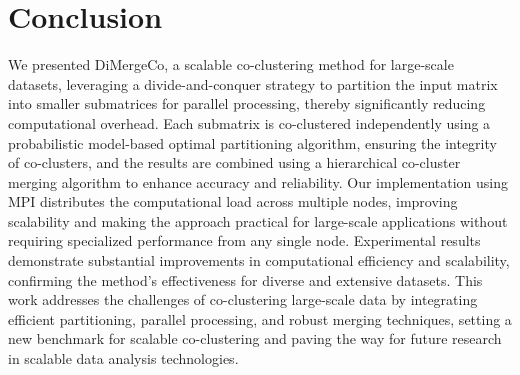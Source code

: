 \documentclass[journal]{IEEEtran}
\begin{document}
\section{Conclusion}
\label{sec:conclusion}
We presented DiMergeCo, a scalable co-clustering method for large-scale datasets, leveraging a divide-and-conquer strategy to partition the input matrix into smaller submatrices for parallel processing, thereby significantly reducing computational overhead. Each submatrix is co-clustered independently using a probabilistic model-based optimal partitioning algorithm, ensuring the integrity of co-clusters, and the results are combined using a hierarchical co-cluster merging algorithm to enhance accuracy and reliability. Our implementation using MPI distributes the computational load across multiple nodes, improving scalability and making the approach practical for large-scale applications without requiring specialized performance from any single node. Experimental results demonstrate substantial improvements in computational efficiency and scalability, confirming the method's effectiveness for diverse and extensive datasets. This work addresses the challenges of co-clustering large-scale data by integrating efficient partitioning, parallel processing, and robust merging techniques, setting a new benchmark for scalable co-clustering and paving the way for future research in scalable data analysis technologies.

\printbibliography
\end{document}
